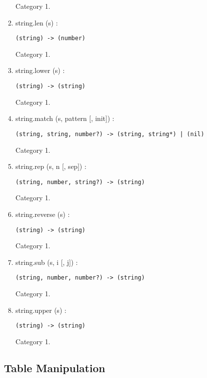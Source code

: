 \begin{enumerate}
Category 1.
\item string.len (s) :
\begin{verbatim}
(string) -> (number)
\end{verbatim}
Category 1.
\item string.lower (s) :
\begin{verbatim}
(string) -> (string)
\end{verbatim}
Category 1.
\item string.match (s, pattern [, init]) :
\begin{verbatim}
(string, string, number?) -> (string, string*) | (nil)
\end{verbatim}
Category 1.
\item string.rep (s, n [, sep]) :
\begin{verbatim}
(string, number, string?) -> (string)
\end{verbatim}
Category 1.
\item string.reverse (s) :
\begin{verbatim}
(string) -> (string)
\end{verbatim}
Category 1.
\item string.sub (s, i [, j]) :
\begin{verbatim}
(string, number, number?) -> (string)
\end{verbatim}
Category 1.
\item string.upper (s) :
\begin{verbatim}
(string) -> (string)
\end{verbatim}
Category 1.
\end{enumerate}

\subsection{Table Manipulation}

